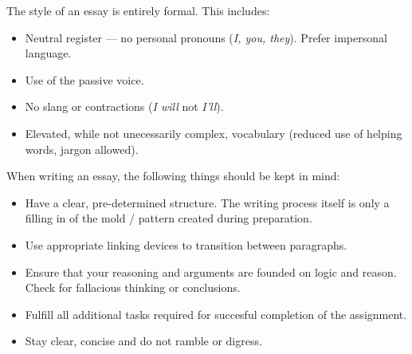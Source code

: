 
The style of an essay is entirely formal. This includes:

\begin{itemize}

	\item Neutral register --- no personal pronouns (\emph{I, you, they}). Prefer impersonal language.

	\item Use of the passive voice. 

	\item No slang or contractions (\emph{I will} not \emph{I'll}).

	\item Elevated, while not unecessarily complex, vocabulary (reduced use of helping words, jargon allowed).

\end{itemize}


When writing an essay, the following things should be kept in mind:

\begin{itemize}

	\item Have a clear, pre-determined structure. The writing process itself is only a filling in of the mold / pattern created during preparation.

	\item Use appropriate linking devices to transition between paragraphs.

	\item Ensure that your reasoning and arguments are founded on logic and reason. Check for fallacious thinking or conclusions.

	\item Fulfill all additional tasks required for succesful completion of the assignment.

	\item Stay clear, concise and do not ramble or digress.

\end{itemize}

